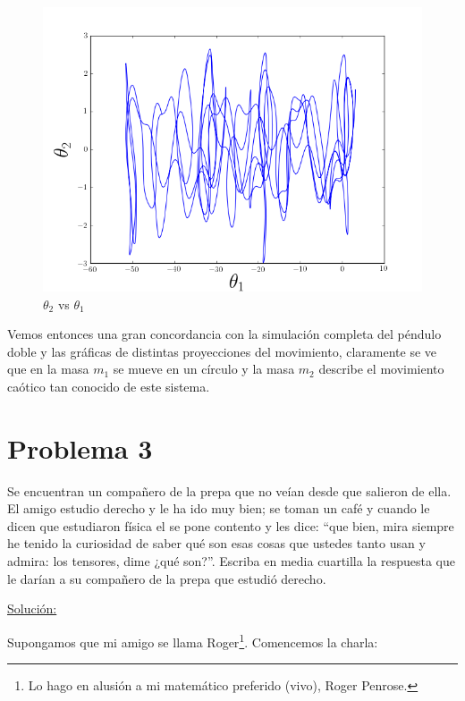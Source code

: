\documentclass[a4paper,10pt]{article}
\numberwithin{equation}{section}
\begin{document}
\begin{figure}[H]
\center
\includegraphics[scale=0.5]{problema2fig6}
\caption{$\theta_2$ vs $\theta_1$}
\label{fig:problema2fig6}
\end{figure}

Vemos entonces una gran concordancia con la simulación completa del péndulo doble y las 
gráficas de distintas proyecciones del movimiento, claramente se ve que en la masa 
$m_1$ se mueve en un círculo y la masa $m_2$ describe el movimiento caótico
tan conocido de este sistema.

\section{Problema 3}

Se encuentran un compañero de la prepa que no veían desde que salieron de ella. El 
amigo estudio derecho y le ha ido muy bien; se toman un café y cuando le dicen que 
estudiaron física el se pone contento y les dice: ``que bien, mira siempre he tenido
la curiosidad de saber qué son esas cosas que ustedes tanto usan y admira: los 
tensores, dime ¿qué son?''. Escriba en media cuartilla la respuesta que le darían 
a su compañero de la prepa que estudió derecho.

\vspace{.3cm}

\underline{Solución:} \vspace{.3cm}

Supongamos que mi amigo se llama Roger\footnote{Lo hago en alusión a mi matemático 
preferido (vivo), Roger Penrose.}. Comencemos la charla:
\end{document}
